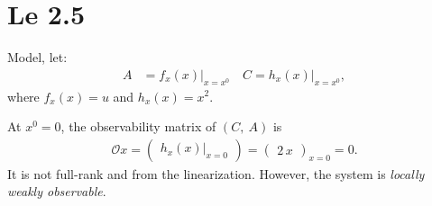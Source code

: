 \section{Le 2.5}
Model, let:
\begin{align*}
    A &= f_x(x)\Big|_{x = x^0} \quad C = h_x(x)\Big|_{x = x^0},
\end{align*}
where $f_x(x) = u$ and $h_x(x) = x^2$. 

At $x^0 = 0$, the observability matrix of $\left(C,\ A\right)$ is 
\begin{align*}
    \mathcal{O}x = \begin{pmatrix}
        h_x(x)|_{x = 0}
    \end{pmatrix} = \begin{pmatrix}
        2\,x
    \end{pmatrix}_{x = 0} = 0.
\end{align*}
It is not full-rank and from the linearization. However, the system is \emph{locally weakly observable}. 




